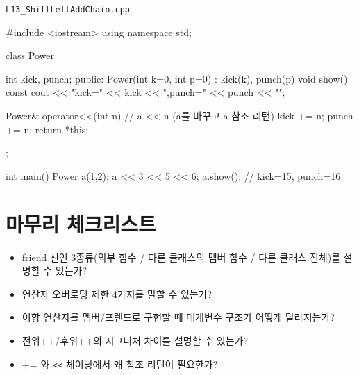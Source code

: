 \documentclass[11pt,a4paper]{article}
\newcommand{\filetag}[1]{\texttt{\color{Accent}#1}}
\begin{document}
\noindent\filetag{L13\_ShiftLeftAddChain.cpp}
\begin{cppcode}
#include <iostream>
using namespace std;

class Power {
    int kick, punch;
public:
    Power(int k=0, int p=0) : kick(k), punch(p) {}
    void show() const { cout << "kick=" << kick << ",punch=" << punch << "\n"; }

    Power& operator<<(int n) { // a << n  (a를 바꾸고 a 참조 리턴)
        kick += n;
        punch += n;
        return *this;
    }
};

int main() {
    Power a(1,2);
    a << 3 << 5 << 6;
    a.show(); // kick=15, punch=16
}
\end{cppcode}

\section*{마무리 체크리스트}
\begin{GoalBox}
\begin{itemize}[leftmargin=18pt]
  \item friend 선언 3종류(외부 함수 / 다른 클래스의 멤버 함수 / 다른 클래스 전체)를 설명할 수 있는가?
  \item 연산자 오버로딩 제한 4가지를 말할 수 있는가?
  \item 이항 연산자를 멤버/프렌드로 구현할 때 매개변수 구조가 어떻게 달라지는가?
  \item 전위++/후위++의 시그니처 차이를 설명할 수 있는가?
  \item += 와 \texttt{<<} 체이닝에서 왜 참조 리턴이 필요한가?
\end{itemize}
\end{GoalBox}
\end{document}
